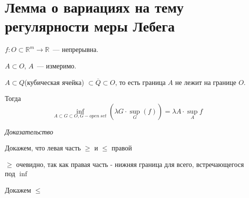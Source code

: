 \documentclass[paper=a4, fontsize=14pt]{report}
\begin{document}
\section{Лемма о вариациях на тему регулярности меры Лебега}
$f: O \subset \mathds{R}^m \rightarrow \mathds{R}$~--- непрерывна.

$A \subset O$, $A$~--- измеримо.

$A \subset Q$(кубическая ячейка) $\subset \overline Q \subset O$, то есть граница $A$ не лежит на границе $O$.

Тогда $$\inf_{A \subset G \subset O, G - open ~ set} (\lambda G \cdot \sup_G(f)) = \lambda A \cdot \sup_A f$$


\emph{Доказательство}

Докажем, что левая часть $\geqslant$ и $\leqslant$ правой

$\geqslant$ очевидно, так как правая часть - нижняя граница для всего, встречающегося под $\inf$

Докажем $\leqslant$
\end{document}
